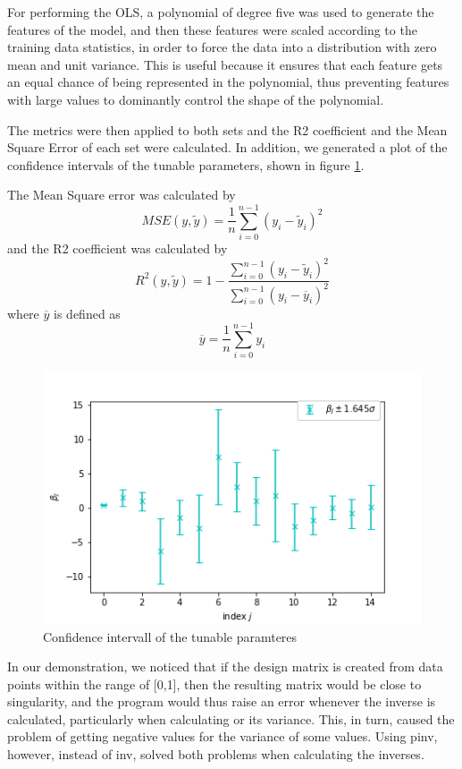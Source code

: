 \documentclass{article}
\begin{document}
For performing the OLS, a polynomial of degree five was used to generate the features of the model, and then these features were scaled according to the training data statistics, in order to force the data into a distribution with zero mean and unit variance. This is useful because it ensures that each feature gets an equal chance of being represented in the polynomial, thus preventing features with large values to dominantly control the shape of the polynomial.

The metrics were then applied to both sets and the R2 coefficient and the Mean Square Error of each set were calculated. In addition, we generated a plot of the confidence intervals of the tunable parameters, shown in figure \ref{fig:confint}.

The Mean Square error was calculated by
\begin{equation}\label{mse}
MSE(y,\tilde{y}) = \dfrac{1}{n}\sum_{i=0}^{n-1} (y_{i} - \tilde{y}_{i})^{2}
\end{equation}
and the R2 coefficient was calculated by
\begin{equation}\label{r2}
R^{2}(y,\tilde{y}) = 1 - \dfrac{\sum_{i=0}^{n-1} (y_{i} - \tilde{y}_{i})^{2}}{\sum_{i=0}^{n-1} (y_{i} - \overline{y}_{i})^{2}}
\end{equation}
where $\overline{y}$ is defined as
\begin{equation}
\overline{y} = \dfrac{1}{n} \sum_{i=0}^{n-1} y_{i}
\end{equation}
\begin{figure}
\includegraphics[scale=0.5]{confidenceintervall.png}
\centering
\caption{Confidence intervall of the tunable paramteres}
\label{fig:confint}
\end{figure}

In our demonstration, we noticed that if the design matrix is created from data points within the range of [0,1], then the resulting  matrix would be close to singularity, and the program would thus raise an error whenever the inverse is calculated, particularly when calculating  or its variance. This, in turn, caused the problem of getting negative values for the variance of some values. Using pinv, however, instead of inv, solved both problems when calculating the inverses.
\end{document}
